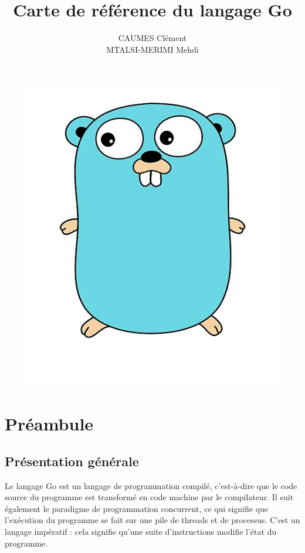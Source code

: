 \documentclass[11pt]{article}
\title{\huge{\textbf {Carte de référence du langage Go}}}
\author{CAUMES Clément \\ MTALSI-MERIMI Mehdi}
\date{}
\begin{document}
\maketitle
\vspace{20em}
\begin{figure}
\centering
\includegraphics[scale=0.2]{pic/logo.jpg}
\end{figure}
\newpage

\tableofcontents
\newpage

\section{Préambule}

\subsection{Présentation générale}

Le langage Go est un langage de programmation compilé, c'est-à-dire que le code source du programme est transformé en code machine par le compilateur. Il suit également le paradigme de programmation concurrent, ce qui signifie que l'exécution du programme se fait sur une pile de threads et de processus. C'est un langage impératif : cela signifie qu'une suite d'instructions modifie l'état du programme. 
\end{document}
